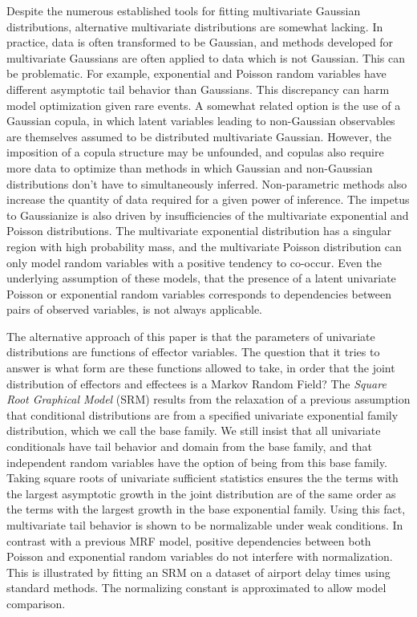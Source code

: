 \documentclass{samkoelleprelimworking}
\newcommand{\vmadd}[1]{\textbf{\color{red}{#1}}}
\begin{document}
Despite the numerous established tools for fitting multivariate Gaussian distributions, alternative multivariate distributions are somewhat lacking.  In practice, data is often transformed to be Gaussian, and methods developed for multivariate Gaussians are often applied to data which is not Gaussian.  This can be problematic.  For example, exponential and Poisson random variables have different asymptotic tail behavior than Gaussians.  This discrepancy can harm model optimization given rare events.  A somewhat related option is the use of a Gaussian copula, in which latent variables leading to non-Gaussian observables are themselves assumed to be distributed \vmadd{as} multivariate Gaussian.  However, the imposition of a copula structure may be unfounded, and copulas also require more data to optimize than methods in which Gaussian and non-Gaussian distributions don't have to simultaneously inferred.  Non-parametric methods also increase the quantity of data required for a given power of inference.  The impetus to Gaussianize is also driven by insufficiencies of the multivariate exponential and Poisson distributions.   The multivariate exponential distribution has a singular region with high probability mass, and the multivariate Poisson distribution can only model random variables with a positive tendency to co-occur.  Even the underlying assumption of these models, that the presence of a latent univariate Poisson or exponential random variables corresponds to dependencies between pairs of observed variables, is not always applicable. 

The alternative approach of this paper is that the parameters of univariate distributions are functions of effector variables.  The question that it tries to answer is what form are these functions allowed to take, in order that the joint distribution of effectors and effectees is a Markov Random Field?  The \textit{Square Root Graphical Model} (SRM) results from the relaxation of a previous assumption that conditional distributions are from a specified univariate exponential family distribution, which we call the base family.  We still insist that all univariate conditionals have tail behavior and domain from the base family, and that independent random variables have the option of being from this base family.  Taking square roots of univariate sufficient statistics ensures the the terms with the largest asymptotic growth in the joint distribution are of the same order as the terms with the largest growth in the base exponential family.  Using this fact, multivariate tail behavior is shown to be normalizable under weak conditions.  In contrast with a previous MRF model, positive dependencies between both Poisson and exponential random variables do not interfere with normalization. This is illustrated by fitting an SRM on a dataset of airport delay times using standard methods.  The normalizing constant is approximated to allow \vmadd{for} model comparison.
\end{document}
